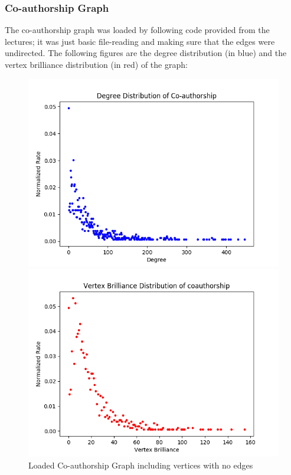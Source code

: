 \documentclass[11pt,a4paper,notitlepage]{article}
\begin{document}
\subsubsection*{Co-authorship Graph}
The co-authorship graph was loaded by following code provided from the lectures; it was just basic file-reading and making sure that the edges were undirected. The following figures are the degree distribution (in blue) and the vertex brilliance distribution (in red) of the graph:
\begin{figure}[H]
    \centering
    \begin{minipage}{0.49\textwidth}
        \centering
        \includegraphics[width=1\textwidth]{coauthorship-vertex-degree.png}
    \end{minipage}
    \begin{minipage}{0.49\textwidth}
        \centering
        \includegraphics[width=1\textwidth]{coauthorship-vertex-brilliance.png}
    \end{minipage} \hfill
    \caption{Loaded Co-authorship Graph including vertices with no edges}
\end{figure}
\end{document}
